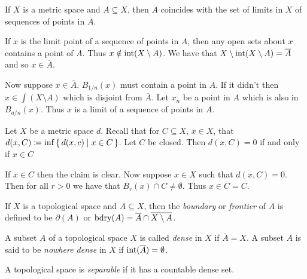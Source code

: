 \documentclass[letterpaper, 11pt, oneside]{book}
\begin{document}
\begin{prop}
  If $X$ is a metric space and $A \subseteq X$, then $\overline{A}$ coincides with the set of limits in $X$ of sequences of points in $A$.
\end{prop}
\begin{pf}
  If $x$ is the limit point of a sequence of points in $A$, then any open sets about $x$ contains a point of $A$.
  Thus $x \notin \operatorname{int}(X \setminus A)$.
  We have that $X \setminus \operatorname{int}(X \setminus A) = \overline{A}$ and so $x \in \overline{A}$.

  Now suppose $x \in \overline{A}$.
  $B_{1 / n}(x)$ must contain a point in $A$.
  If it didn't then $x \in \int(X \setminus A)$ which is disjoint from $\overline{A}$.
  Let $x_{n}$ be a point in $A$ which is also in $B_{a / n}(x)$.
  Thus $x$ is a limit of a sequence of points in $A$.
\end{pf}

\begin{prop}\label{prop: closed_dist_inf_0}
  Let $X$ be a metric space $d$.
  Recall that for $C \subseteq X$, $x \in X$, that $d(x, C) \coloneqq \inf\set{d(x, c) | x \in C}$.
  Let $C$ be closed.
  Then $d(x, C) = 0$ if and only if $x \in C$
\end{prop}
\begin{pf}
  If $x \in C$ then the claim is clear.
  Now suppose $x \in X$ such that $d(x, C) = 0$.
  Then for all $r > 0$ we have that $B_{r}(x) \cap C \neq \emptyset$.
  Thus $x \in \overline{C} = C$.
\end{pf}

\begin{defn}[Boundary]
  If $X$ is a topological space and $A \subseteq X$, then the \emph{boundary} or \emph{frontier} of $A$ is defined to be $\partial(A)$ or $\operatorname{bdry}(A) = \overline{A} \cap \overline{X \setminus A}$.
\end{defn}

\begin{defn}
  A subset $A$ of a topological space $X$ is called \emph{dense} in $X$ if $\overline{A} = X$.
  A subset $A$ is said to be \emph{nowhere dense} in $X$ if $\operatorname{int}(\overline{A}) = \emptyset$.
\end{defn}

\begin{defn}
  A topological space is \emph{separable} if it has a countable dense set.
\end{defn}
\end{document}
